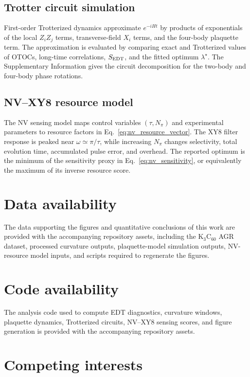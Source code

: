 \documentclass[
  prx,
  reprint,
  superscriptaddress,
  amsmath,
  amssymb,
  aps
]{revtex4-2}
\begin{document}
\subsection{Trotter circuit simulation}

First-order Trotterized dynamics approximate $e^{-iHt}$ by products of exponentials of the local $Z_iZ_j$ terms, transverse-field $X_i$ terms, and the four-body plaquette term. The approximation is evaluated by comparing exact and Trotterized values of OTOCs, long-time correlations, $S_{\rm EDT}$, and the fitted optimum $\lambda^\star$. The Supplementary Information gives the circuit decomposition for the two-body and four-body phase rotations.

\subsection{NV--XY8 resource model}

The NV sensing model maps control variables $(\tau,N_\pi)$ and experimental parameters to resource factors in Eq.~\eqref{eq:nv_resource_vector}. The XY8 filter response is peaked near $\omega\simeq\pi/\tau$, while increasing $N_\pi$ changes selectivity, total evolution time, accumulated pulse error, and overhead. The reported optimum is the minimum of the sensitivity proxy in Eq.~\eqref{eq:nv_sensitivity}, or equivalently the maximum of its inverse resource score.

\section*{Data availability}

The data supporting the figures and quantitative conclusions of this work are provided with the accompanying repository assets, including the K$_3$C$_{60}$ AGR dataset, processed curvature outputs, plaquette-model simulation outputs, NV-resource model inputs, and scripts required to regenerate the figures.

\section*{Code availability}

The analysis code used to compute EDT diagnostics, curvature windows, plaquette dynamics, Trotterized circuits, NV--XY8 sensing scores, and figure generation is provided with the accompanying repository assets.

\section*{Competing interests}
\end{document}
